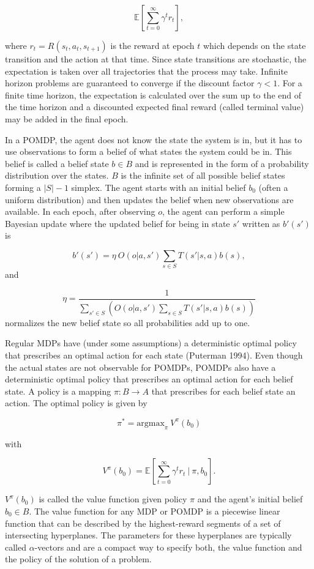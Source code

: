 \[\mathbb{E}\left[\sum_{t=0}^{\infty} \gamma^t r_t\right],\]

where \(r_t = R(s_t, a_t, s_{t+1})\) is the reward at epoch \(t\) which depends on the state transition and the action at that time.
Since state transitions are stochastic,
the expectation is taken over all trajectories that the process may take.
Infinite horizon problems are guaranteed to converge if the discount factor \(\gamma < 1\).
For a finite time horizon, the expectation is calculated over the sum up to the end of the
time horizon and a discounted expected final reward (called terminal value) may be added in the final epoch.

In a POMDP, the agent does not know the state the system is in, but it has to use
observations
to form a belief of what states the system could be in. This belief is called a belief state \(b \in B\) and is
represented in the form of a probability distribution over the states. \(B\) is the infinite set of all possible belief states
forming a \(|S|-1\) simplex.
The agent starts with an initial belief \(b_0\) (often a uniform distribution) and then updates the belief when new
observations are available.
In each epoch, after observing \(o\), the
agent can perform a simple Bayesian update where the
updated belief for being in state \(s'\) written as \(b'(s')\) is

\[
b'(s') = \eta\ O(o | a, s') \sum_{s \in S} T(s' | s,a) b(s),
\]
and

\[
\eta = \frac{1}{\sum_{s' \in S}\left( O(o | a, s') \sum_{s \in S} T(s' | s,a) b(s)\right)}
\]
normalizes the new belief state so all probabilities add up to one.

Regular MDPs have (under some assumptions) a deterministic optimal policy that prescribes an optimal action for
each state (Puterman 1994). Even though
the actual states are not observable for POMDPs, POMDPs also have a
deterministic optimal policy that prescribes an optimal action for
each belief state.
A policy is a mapping \(\pi: B \rightarrow A\) that prescribes
for each belief state an action.
The optimal policy is given by

\[\pi^* = \mathrm{argmax}_\pi \  V^\pi(b_0)\]

with

\[V^\pi(b_0) =   \mathbb{E}\left[\sum_{t=0}^{\infty} \gamma^t r_t  \ \bigg\vert \ \pi, b_0 \right].\]

\(V^\pi(b_0)\)
is called the value function given policy \(\pi\) and the agent's
initial belief \(b_0 \in B\). The value function for any MDP or POMDP is a piecewise linear function that can be described by the
highest-reward segments of
a set of intersecting hyperplanes. The parameters for these hyperplanes are typically called \(\alpha\)-vectors and
are a compact way to specify
both, the value function and the policy of the solution of a problem.

